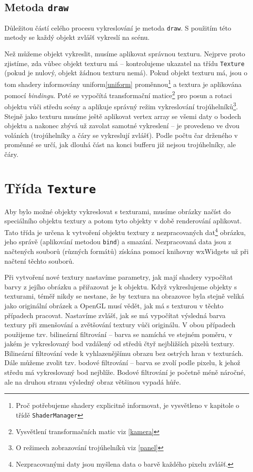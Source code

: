 \documentclass[a4paper, 11pt]{report}
\begin{document}
\subsection{Metoda \texttt{draw}}
Důležitou částí celého procesu vykreslování je metoda \texttt{draw}. S použitím této metody se každý objekt zvlášť vykreslí na scénu.

Než můžeme objekt vykreslit, musíme aplikovat správnou texturu. Nejprve proto zjistíme, zda vůbec objekt texturu má -- kontrolujeme ukazatel na třídu \texttt{Texture} (pokud je nulový, objekt žádnou texturu nemá). Pokud objekt texturu má, jsou o tom shadery informovány uniform\cref{uniform} proměnnou\footnote{Proč potřebujeme shadery explicitně informovat, je vysvětleno v kapitole o třídě \texttt{ShaderManager}} a textura je aplikována pomocí \emph{bindingu}. Poté se vypočítá transformační matice\footnote{Vysvětlení transformačních matic viz \ref{kamera}} pro posun a rotaci objektu vůči středu scény a aplikuje správný režim vykreslování trojúhelníků\footnote{O režimech zobrazování trojúhelníků viz \ref{panel}}. Stejně jako texturu musíme ještě aplikovat vertex array se všemi daty o bodech objektu a nakonec zbývá už zavolat samotné vykreslení -- je provedeno ve dvou voláních (trojúhelníky a čáry se vykreslují zvlášť). Podle počtu čar drženého v proměnné se určí, jak dlouhá část na konci bufferu již nejsou trojúhelníky, ale čáry.

\section{Třída \texttt{Texture}}
Aby bylo možné objekty vykreslovat s texturami, musíme obrázky načíst do speciálního objektu textury a potom tyto objekty v době renderování aplikovat. Tato třída je určena k vytvoření objektu textury z nezpracovaných dat\footnote{Nezpracovanými daty jsou myšlena data o barvě každého pixelu zvlášť.} obrázku, jeho správě (aplikování metodou \texttt{bind}) a smazání. Nezpracovaná data jsou z načtených souborů (různých formátů) získána pomocí knihovny wxWidgets už při načtení těchto souborů. 

Při vytvoření nové textury nastavíme parametry, jak mají shadery vypočítat barvy z jejího obrázku a přiřazovat je k objektu. Když vykreslujeme objekty s texturami, téměř nikdy se nestane, že by textura na obrazovce byla stejně veliká jako originální obrázek a OpenGL musí vědět, jak má s texturou v těchto případech pracovat. Nastavíme zvlášť, jak se má vypočítat výsledná barva textury při zmenšování a zvětšování textury vůči originálu. V obou případech použijeme tzv. bilineární filtrování -- barva se namíchá ve stejném poměru, v jakém je vykreslovaný bod vzdálený od středů čtyř nejbližších pixelů textury. Bilineární filtrování vede k vyhlazenějšímu obrazu bez ostrých hran v texturách. Dále můžeme zvolit tzv. bodové filtrování -- barva se zvolí podle pixelu, k jehož středu má vykreslovaný bod nejblíže. Bodové filtrování je početně méně náročné, ale na druhou stranu výsledný obraz většinou vypadá hůře.
\end{document}
